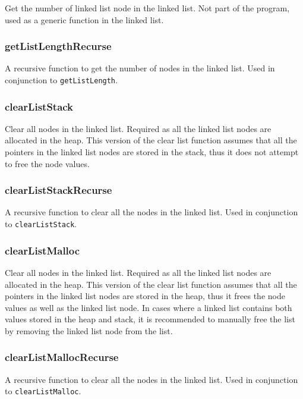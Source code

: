 \documentclass[a4paper, 12pt, titlepage]{article}
\newcommand{\code}[1]{\small\texttt{#1}\normalsize}
\begin{document}
Get the number of linked list node in the linked list. Not part of the 
program, used as a generic function in the linked list.

\subsubsection{getListLengthRecurse}

A recursive function to get the number of nodes in the linked list. Used in 
conjunction to \code{getListLength}.

\subsubsection{clearListStack}

Clear all nodes in the linked list. Required as all the linked list nodes are 
allocated in the heap. This version of the clear list function assumes that 
all the pointers in the linked list nodes are stored in the stack, thus it 
does not attempt to free the node values.

\subsubsection{clearListStackRecurse}

A recursive function to clear all the nodes in the linked list. Used in 
conjunction to \code{clearListStack}.

\subsubsection{clearListMalloc}

Clear all nodes in the linked list. Required as all the linked list nodes are 
allocated in the heap. This version of the clear list function assumes that 
all the pointers in the linked list nodes are stored in the heap, thus it 
frees the node values as well as the linked list node. In cases where a 
linked list contains both values stored in the heap and stack, it is 
recommended to manually free the list by removing the linked list node from 
the list.

\subsubsection{clearListMallocRecurse}

A recursive function to clear all the nodes in the linked list. Used in 
conjunction to \code{clearListMalloc}.
\end{document}

